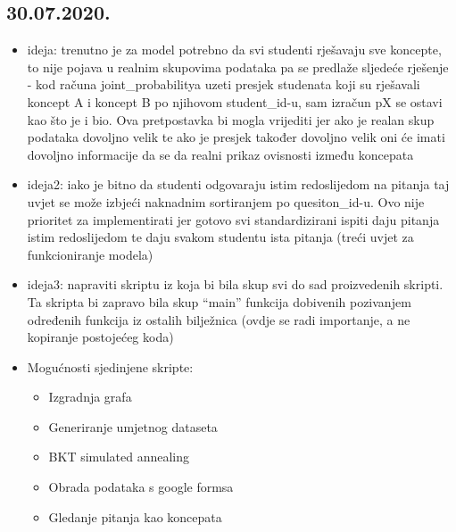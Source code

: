 \documentclass[times, utf8,projekt]{fer}
\begin{document}
		\subsection{30.07.2020.}
		\begin{itemize}
			\item 	ideja: trenutno je za model potrebno da svi studenti rješavaju sve koncepte, to nije pojava u realnim skupovima podataka pa se predlaže sljedeće rješenje - kod računa joint\_probabilitya uzeti presjek studenata koji su rješavali koncept A i koncept B po njihovom student\_id-u, sam izračun pX se ostavi kao što je i bio. Ova pretpostavka bi mogla vrijediti jer ako je realan skup podataka dovoljno velik te ako je presjek također dovoljno velik oni će imati dovoljno informacije da se da realni prikaz ovisnosti između koncepata
			\item ideja2: iako je bitno da studenti odgovaraju istim redoslijedom na pitanja taj uvjet se može izbjeći naknadnim sortiranjem po quesiton\_id-u. Ovo nije prioritet za implementirati jer gotovo svi standardizirani ispiti daju pitanja istim redoslijedom te daju svakom studentu ista pitanja (treći uvjet za funkcioniranje modela)
			\item ideja3: napraviti skriptu iz koja bi bila skup svi do sad proizvedenih skripti. Ta skripta bi zapravo bila skup “main” funkcija dobivenih pozivanjem određenih funkcija iz  ostalih bilježnica (ovdje se radi importanje, a ne kopiranje postojećeg koda)
			\item Mogućnosti sjedinjene skripte:
			\begin{itemize}
				\item Izgradnja grafa
				\item Generiranje umjetnog dataseta
				\item BKT simulated annealing
				\item Obrada podataka s google formsa
				\item Gledanje pitanja kao koncepata
			\end{itemize}
		\end{itemize}
	
\end{document}
